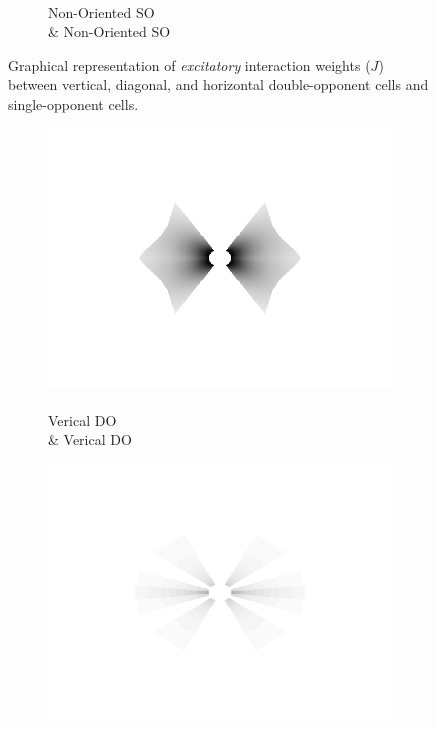 \documentclass[journal,onecolumn]{IEEEtran}
\begin{document}
\begin{figure}[htbp!]
\begin{subfigure}[b]{0.2\textwidth}
            \caption{\\ Non-Oriented SO \\ \& Non-Oriented SO}
    \end{subfigure}%
    \caption{Graphical representation of \textit{excitatory} interaction weights ($J$) between vertical, diagonal, and horizontal double-opponent cells and single-opponent cells.}
\end{figure}

\begin{figure}[htbp!] \label{fig:bowtie-excite-maps}
    \centering
    \begin{subfigure}[b]{0.2\textwidth}
            \centering
            \captionsetup{justification=centering}
            \includegraphics[width=.85\linewidth]{map-w_1_1}
            \caption{\\ Verical DO \\ \& Verical DO}
    \end{subfigure}%
    \begin{subfigure}[b]{0.2\textwidth}
            \centering
            \captionsetup{justification=centering}
            \includegraphics[width=.85\linewidth]{map-w_1_2}

\end{subfigure}
\end{figure}
\end{document}
